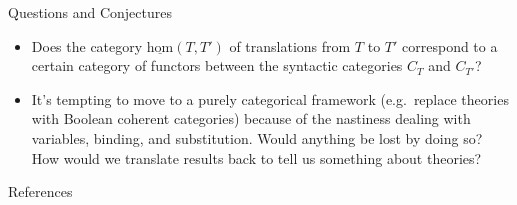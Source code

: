 \documentclass[ignorenonframetext,fleqn]{beamer}
\newcommand{\2}{\mathcal}
\begin{document}
\begin{frame}{Questions and Conjectures}

  \begin{itemize}
  \item Does the category $\underline{\mathrm{hom}}(T,T')$ of
    translations from $T$ to $T'$ correspond to a certain category of
    functors between the syntactic categories $C_T$ and $C_{T'}$?
  \item It's tempting to move to a purely categorical framework (e.g.\
    replace theories with Boolean coherent categories) because of the
    nastiness dealing with variables, binding, and substitution. Would
    anything be lost by doing so? How would we translate results back
    to tell us something about theories?
  \end{itemize}


\end{frame}

\begin{frame}[allowframebreaks]{References}

  \nocite{mitchell}

\begin{tiny}
  \printbibliography
  \end{tiny}


\end{frame}
\end{document}
